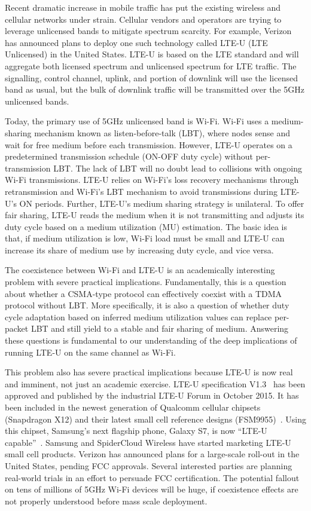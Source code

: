 Recent dramatic increase in mobile traffic has put the existing wireless and cellular networks under strain. 
Cellular vendors and operators are trying to leverage unlicensed bands to mitigate spectrum scarcity.
For example, Verizon has announced plans to deploy one such technology called LTE-U (LTE Unlicensed) in the United States.
LTE-U is based on the LTE standard and will aggregate both licensed spectrum and unlicensed spectrum for LTE traffic.
The signalling, control channel, uplink, and portion of downlink will use the licensed band as usual, but the bulk of downlink traffic will be transmitted over the 5GHz unlicensed bands.  

Today, the primary use of 5GHz unlicensed band is Wi-Fi.
Wi-Fi uses a medium-sharing mechanism known as listen-before-talk (LBT), where nodes sense and wait for free medium before each transmission.
However, LTE-U operates on a predetermined transmission schedule (ON-OFF duty cycle) without per-transmission LBT.
The lack of LBT will no doubt lead to collisions with ongoing Wi-Fi transmissions. 
LTE-U relies on Wi-Fi's loss recovery mechanisms through retransmission and Wi-Fi's LBT mechanism to avoid transmissions during LTE-U's ON periods.
Further, LTE-U's medium sharing strategy is unilateral.
To offer fair sharing, LTE-U reads the medium when it is not transmitting and adjusts its duty cycle based on a medium utilization (MU) estimation.
The basic idea is that, if medium utilization is low, Wi-Fi load must be small and LTE-U can increase its share of medium use by increasing duty cycle, and vice versa. 

The coexistence between Wi-Fi and LTE-U is an academically interesting problem with severe practical implications.
Fundamentally, this is a question about whether a CSMA-type protocol can effectively coexist with a TDMA protocol without LBT.
More specifically, it is also a question of whether duty cycle adaptation based on inferred medium utilization values can replace per-packet LBT and still yield to a stable and fair sharing of medium.
Answering these questions is fundamental to our understanding of the deep implications of running LTE-U on the same channel as Wi-Fi.

This problem also has severe practical implications because LTE-U is now real and imminent, not just an academic exercise.
LTE-U specification V1.3~\cite{lteuforum_lteu} has been approved and published by the industrial LTE-U Forum in October 2015.
It has been included in the newest generation of Qualcomm cellular chipsets (Snapdragon X12) and their latest small cell reference designs (FSM9955)~\cite{x12}. 
Using this chipset, Samsung's next flagship phone, Galaxy S7, is now ``LTE-U capable''~\cite{s7}.
Samsung and SpiderCloud Wireless have started marketing LTE-U small cell products.
Verizon has announced plans for a large-scale roll-out in the United States, pending FCC approvals. 
Several interested parties are planning real-world trials in an effort to persuade FCC certification.
The potential fallout on tens of millions of 5GHz Wi-Fi devices will be huge, 
if coexistence effects are not properly understood before mass scale deployment. 


